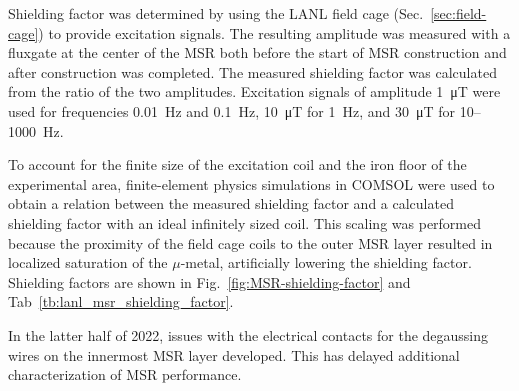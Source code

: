 Shielding factor was determined by using the LANL field cage (Sec.~\ref{sec:field-cage}) to provide excitation signals. The resulting amplitude was measured with a fluxgate at the center of the MSR both before the start of MSR construction and after construction was completed. The measured shielding factor was calculated from the ratio of the two amplitudes. Excitation signals of amplitude \qty{1}{\micro\tesla} were used for frequencies \qty{0.01}{\hertz} and \qty{0.1}{\hertz}, \qty{10}{\micro\tesla} for \qty{1}{\hertz}, and \qty{30}{\micro\tesla} for 10--\qty{1000}{\hertz}. 

To account for the finite size of the excitation coil and the iron floor of the experimental area, finite-element physics simulations in COMSOL were used to obtain a relation between the measured shielding factor and a calculated shielding factor with an ideal infinitely sized coil. This scaling was performed because the proximity of the field cage coils to the outer MSR layer resulted in localized saturation of the $\mu$-metal, artificially lowering the shielding factor. Shielding factors are shown in Fig.~\ref{fig:MSR-shielding-factor} and Tab~\ref{tb:lanl_msr_shielding_factor}. 

In the latter half of 2022, issues with the electrical contacts for the degaussing wires on the innermost MSR layer developed. This has delayed additional characterization of MSR performance.

